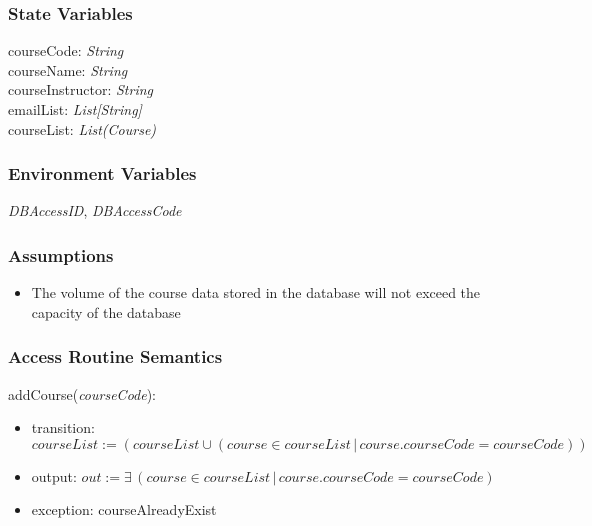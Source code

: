 \documentclass[12pt, titlepage]{article}
\begin{document}
\subsubsection{State Variables}

courseCode: \textit{String}\\
courseName: \textit{String}\\
courseInstructor: \textit{String}\\
emailList: \textit{List[String]}\\
courseList: \textit{List(Course)}\\


\subsubsection{Environment Variables}

\textit{DBAccessID}, \textit{DBAccessCode}

\subsubsection{Assumptions}

\begin{itemize}
  \item The volume of the course data stored in the database will not exceed the capacity of the database
\end{itemize}

\subsubsection{Access Routine Semantics}

\noindent addCourse(\textit{courseCode}):
\begin{itemize}
\item transition: \(courseList := (courseList \cup (course \in courseList \, | \, course.courseCode = courseCode))\)
\item output: $out := \mathit{\exists \, (course \in courseList \, | \, course.courseCode = courseCode)
}$
\item exception: courseAlreadyExist
\end{itemize}
\end{document}
